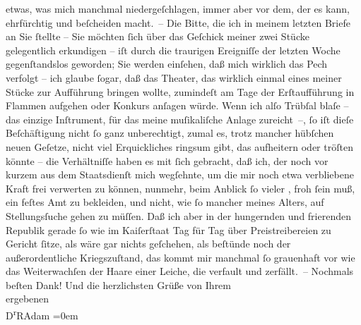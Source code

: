 \begin{ledgroupsized}[t]{13cm}
               etwas, was mich manchmal niedergeſchlagen, immer aber vor dem, der es kann,
               ehrfürchtig und beſcheiden {\pb}macht. –\pend
           \pstart
           Die Bitte, die ich in meinem letzten Briefe an Sie ſtellte – Sie möchten ſich über
               das Geſchick meiner zwei Stücke gelegentlich erkundigen – iſt durch die traurigen Ereigniſſe der
               letzten Woche gegenſtandslos geworden; Sie werden einſehen, daß mich wirklich das
               Pech verfolgt – ich glaube ſogar, daß das Theater, das wirklich einmal eines meiner
               Stücke zur Aufführung bringen wollte, zumindeſt am Tage der Erſtaufführung in Flammen
               aufgehen oder Konkurs anſagen würde. Wenn ich alſo Trübſal blaſe – das einzige
               Inſtrument, für das meine muſikaliſche Anlage zureicht –, ſo iſt dieſe Beſchäftigung
               nicht ſo ganz unberechtigt, zumal es, trotz mancher hübſchen neuen Geſetze, nicht
               viel Erquickliches ringsum gibt, das aufheitern oder tröſten könnte – die
               Verhältniſſe haben es mit ſich gebracht, daß ich, der noch vor kurzem aus dem
               Staatsdienſt mich wegſehnte, um die mir noch etwa verbliebene Kraft frei verwerten zu
               können, nunmehr, beim Anblick ſo vieler \label{K_L02315-1v}\label{K_L02315-1h}, froh ſein muß, ein feſtes Amt zu bekleiden, und nicht, wie ſo
               mancher meines Alters, auf Stel{\pb}lungsſuche
               gehen zu müſſen. Daß ich aber in der hungernden und frierenden Republik gerade ſo wie im Kaiſerſtaat Tag
               für Tag über Preistreibereien zu Gericht ſitze, als wäre gar nichts geſchehen, als
               beſtünde noch der außerordentliche Kriegszuſtand, das kommt mir manchmal ſo
               grauenhaft vor wie das Weiterwachſen der Haare einer Leiche, die verfault und
               zerfällt. –\pend
           \pstart
           Nochmals beſten Dank! Und die herzlichsten Grüße von Ihrem{\\[\baselineskip]}ergebenen{\\[\baselineskip]}\spacefill\mbox{D\textsuperscript{r}RAdam}\pend
           \leftskip=0em{}
         
         \endnumbering{}\end{ledgroupsized}  \newcommand{\dateiname}{L02315}\newcommand{\titel}{Robert Adam an Arthur Schnitzler, 8. 12. 1918}\newcommand{\editorInnen}{Martin Anton Müller und Gerd-Hermann Susen}
      